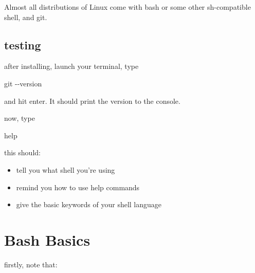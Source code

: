 \documentclass[
]{article}
\newenvironment{Shaded}{}{}
\newcommand{\AttributeTok}[1]{\textcolor[rgb]{0.49,0.56,0.16}{#1}}
\newcommand{\BuiltInTok}[1]{#1}
\newcommand{\FunctionTok}[1]{\textcolor[rgb]{0.02,0.16,0.49}{#1}}
\providecommand{\tightlist}{%
  \setlength{\itemsep}{0pt}\setlength{\parskip}{0pt}}
\begin{document}
Almost all distributions of Linux come with bash or some other
sh-compatible shell, and git.

\hypertarget{testing}{%
\subsection{testing}\label{testing}}

after installing, launch your terminal, type

\begin{Shaded}
\begin{Highlighting}[]
\FunctionTok{git} \AttributeTok{{-}{-}version}
\end{Highlighting}
\end{Shaded}

and hit enter. It should print the version to the console.

now, type

\begin{Shaded}
\begin{Highlighting}[]
\BuiltInTok{help}
\end{Highlighting}
\end{Shaded}

this should:

\begin{itemize}
\tightlist
\item
  tell you what shell you're using
\item
  remind you how to use help commands
\item
  give the basic keywords of your shell language
\end{itemize}

\hypertarget{bash-basics}{%
\section{Bash Basics}\label{bash-basics}}

firstly, note that:
\end{document}
